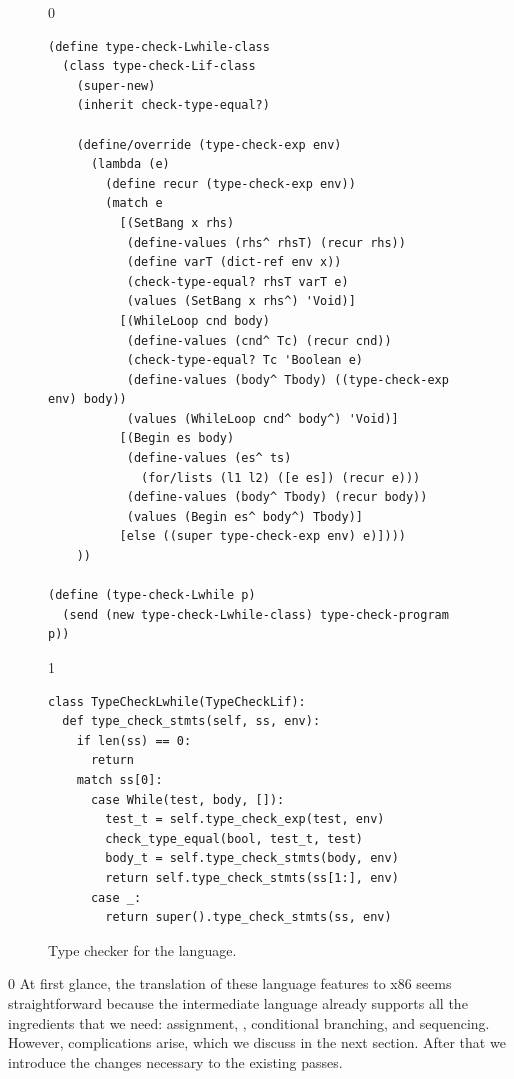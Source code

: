 \documentclass[7x10]{TimesAPriori_MIT}%
\def\racketEd{0}
\def\pythonEd{1}
\providecommand{\BookEdition}{1}
\let\edition\BookEdition
\newcommand{\pythonColor}[0]{}
\numberwithin{theorem}{chapter}
\numberwithin{definition}{chapter}
\numberwithin{equation}{chapter}
\begin{document}
\begin{figure}[tbp]
\begin{tcolorbox}[colback=white]  
{\if\edition\racketEd    
\begin{lstlisting}[basicstyle=\ttfamily\footnotesize]
(define type-check-Lwhile-class
  (class type-check-Lif-class
    (super-new)
    (inherit check-type-equal?)

    (define/override (type-check-exp env)
      (lambda (e)
        (define recur (type-check-exp env))
        (match e
          [(SetBang x rhs)
           (define-values (rhs^ rhsT) (recur rhs))
           (define varT (dict-ref env x))
           (check-type-equal? rhsT varT e)
           (values (SetBang x rhs^) 'Void)]
          [(WhileLoop cnd body)
           (define-values (cnd^ Tc) (recur cnd))
           (check-type-equal? Tc 'Boolean e)
           (define-values (body^ Tbody) ((type-check-exp env) body))
           (values (WhileLoop cnd^ body^) 'Void)]
          [(Begin es body)
           (define-values (es^ ts)
             (for/lists (l1 l2) ([e es]) (recur e)))
           (define-values (body^ Tbody) (recur body))
           (values (Begin es^ body^) Tbody)]
          [else ((super type-check-exp env) e)])))
    ))

(define (type-check-Lwhile p)
  (send (new type-check-Lwhile-class) type-check-program p))
\end{lstlisting}
\fi}
{\if\edition\pythonEd\pythonColor
\begin{lstlisting}
class TypeCheckLwhile(TypeCheckLif):
  def type_check_stmts(self, ss, env):
    if len(ss) == 0:
      return
    match ss[0]:
      case While(test, body, []):
        test_t = self.type_check_exp(test, env)
        check_type_equal(bool, test_t, test)
        body_t = self.type_check_stmts(body, env)
        return self.type_check_stmts(ss[1:], env)
      case _:
        return super().type_check_stmts(ss, env)
\end{lstlisting}
\fi}
\end{tcolorbox}

\caption{Type checker for the \LangLoop{} language.}
\label{fig:type-check-Lwhile}
\end{figure}


{\if\edition\racketEd    
%  
At first glance, the translation of these language features to x86
seems straightforward because the \LangCIf{} intermediate language
already supports all the ingredients that we need: assignment,
, conditional branching, and sequencing. However, 
complications arise, which we discuss in the next section. After
that we introduce the changes necessary to the existing passes.
%
\fi}
\end{document}
